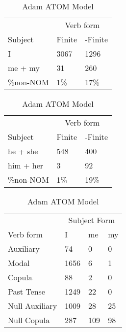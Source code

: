 \begin{table}[]
\caption{Adam ATOM Model}
\begin{minipage}{0.5\textwidth}
    \centering
    \begin{tabular}{@{}lll@{}}
        \toprule
         & \multicolumn{2}{c}{Verb form}\\
         \cline{2-3}
        Subject & Finite & -Finite \\
        \midrule
        I & 3067 & 1296 \\
        me + my & 31 & 260 \\
        \hline
        \%non-NOM & 1\% & 17\% \\
        \bottomrule
    \end{tabular}
\end{minipage}
\begin{minipage}{0.5\textwidth}
    \centering
    \begin{tabular}{@{}lll@{}}
        \toprule
         & \multicolumn{2}{c}{Verb form}\\
         \cline{2-3}
        Subject & Finite & -Finite \\
        \midrule
        he + she & 548 & 400 \\
        him + her & 3 & 92 \\
        \hline
        \%non-NOM & 1\% & 19\% \\
        \bottomrule
    \end{tabular}
    \end{minipage}
\begin{minipage}{0.5\textwidth}
    \centering
    \begin{tabular}{@{}llll@{}}
        \toprule
            &\multicolumn{3}{c}{Subject Form}\\
            \cline{2-4}
        Verb form & I & me & my \\
        \midrule
        Auxiliary & 74 & 0 & 0 \\
        Modal & 1656 & 6 & 1 \\
        Copula & 88 & 2 & 0 \\
        Past Tense & 1249 & 22 & 0 \\
        \hline
        Null Auxiliary & 1009 & 28 & 25 \\
        Null Copula & 287 & 109 & 98 \\
        \bottomrule
    \end{tabular}

\end{minipage}
\end{table}
